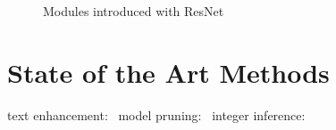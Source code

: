 \begin{figure}[ht]
    \centering
    \caption{Modules introduced with ResNet\label{fig:resnet}}
\end{figure}

\section{State of the Art Methods}

text enhancement:~\cite{chen_text_2021}
model pruning:~\cite{niu_26ms_2019}
integer inference:~\cite{ignatov_ai_2019}
